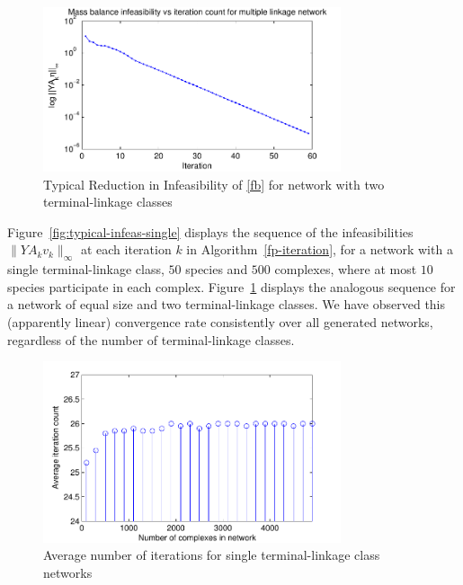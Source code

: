 \documentclass[smallextended]{svjour3}       %
\newcommand*{\0}{\mathbf{0}}
\newcommand*{\1}{\mathbf{1}}
\begin{document}
\begin{figure}%
   \centering
   \includegraphics[width=0.78\textwidth]{InfeasibilityVsIterationMultiple}
   \caption{Typical Reduction in Infeasibility of \eqref{fb} for network with
            two terminal-linkage classes}
   \label{fig:typical-infeas-multiple}
\end{figure}

Figure~\ref{fig:typical-infeas-single} displays the sequence of the
infeasibilities $\|YA_kv_k\|_\infty$ at each iteration $k$ in
Algorithm~\ref{fp-iteration}, for a network with a single
terminal-linkage class, $50$ species and $500$ complexes, where at
most $10$ species participate in each
complex. Figure~\ref{fig:typical-infeas-multiple} displays the
analogous sequence for a network of equal size and two
terminal-linkage classes.  We have observed this (apparently linear)
convergence rate consistently over all generated networks, regardless
of the number of terminal-linkage classes.

\begin{figure}%
   \centering
   \includegraphics[width=0.78\textwidth]{SingleNetAvgIterationsVsNetSize} 
   \caption{Average number of iterations for single terminal-linkage class
            networks}
   \label{fig:iteration-count-simple} 
\end{figure}
\end{document}
